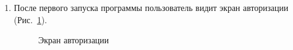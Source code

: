 \documentclass{../includes/TechDoc}
\begin{document}
    \begin{enumerate}
        \item После первого запуска программы пользователь видит экран авторизации (Рис.~\ref{fig:login}).
        \begin{figure}[h]
            \centering
            \caption{Экран авторизации}
            \label{fig:login}
        \end{figure}


\end{enumerate}
\end{document}
